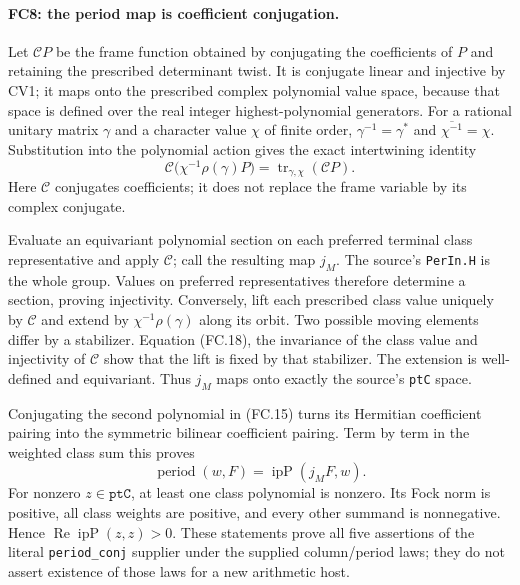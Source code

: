 \paragraph{FC8: the period map is coefficient conjugation.}
Let $\mathcal C P$ be the frame function obtained by conjugating the
coefficients of $P$ and retaining the prescribed determinant twist.
It is conjugate linear and injective by CV1; it maps onto the prescribed
complex polynomial value space, because that space is defined over the
real integer highest-polynomial generators. For a rational unitary
matrix $\gamma$ and a character value $\chi$ of finite order,
$\gamma^{-1}=\gamma^*$ and $\overline{\chi^{-1}}=\chi$.
Substitution into the polynomial action gives the exact intertwining
identity
\[
 \mathcal C\bigl(\chi^{-1}\rho(\gamma)P\bigr)
          =\operatorname{tr}_{\gamma,\chi}(\mathcal C P).
 \tag{FC.18}
\]
Here $\mathcal C$ conjugates coefficients; it does not replace the
frame variable by its complex conjugate.

Evaluate an equivariant polynomial section on each preferred terminal
class representative and apply $\mathcal C$; call the resulting map
$j_M$. The source's \texttt{PerIn.H} is the whole group. Values on
preferred representatives therefore determine a section, proving
injectivity. Conversely, lift each prescribed class value uniquely by
$\mathcal C$ and extend by $\chi^{-1}\rho(\gamma)$ along its orbit.
Two possible moving elements differ by a stabilizer. Equation (FC.18),
the invariance of the class value and injectivity of $\mathcal C$
show that the lift is fixed by that stabilizer. The extension is
well-defined and equivariant. Thus $j_M$ maps onto exactly
the source's \texttt{ptC} space.

Conjugating the second polynomial in (FC.15) turns its Hermitian
coefficient pairing into the symmetric bilinear coefficient pairing.
Term by term in the weighted class sum this proves
\[
 \operatorname{period}(w,F)=\operatorname{ipP}(j_MF,w).
 \tag{FC.19}
\]
For nonzero $z\in\texttt{ptC}$, at least one class polynomial is
nonzero. Its Fock norm is positive, all class weights are positive,
and every other summand is nonnegative. Hence
$\operatorname{Re}\operatorname{ipP}(z,z)>0$. These statements prove
all five assertions of the literal \texttt{period\_conj} supplier
under the supplied column/period laws; they do not assert existence of
those laws for a new arithmetic host.

